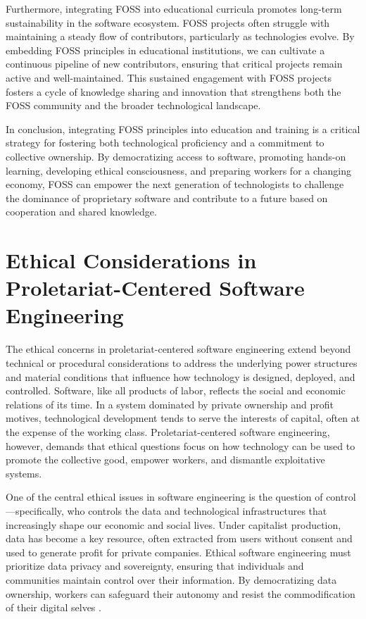 \begin{refsection}
Furthermore, integrating FOSS into educational curricula promotes long-term sustainability in the software ecosystem. FOSS projects often struggle with maintaining a steady flow of contributors, particularly as technologies evolve. By embedding FOSS principles in educational institutions, we can cultivate a continuous pipeline of new contributors, ensuring that critical projects remain active and well-maintained. This sustained engagement with FOSS projects fosters a cycle of knowledge sharing and innovation that strengthens both the FOSS community and the broader technological landscape.

In conclusion, integrating FOSS principles into education and training is a critical strategy for fostering both technological proficiency and a commitment to collective ownership. By democratizing access to software, promoting hands-on learning, developing ethical consciousness, and preparing workers for a changing economy, FOSS can empower the next generation of technologists to challenge the dominance of proprietary software and contribute to a future based on cooperation and shared knowledge.

\section{Ethical Considerations in Proletariat-Centered Software Engineering}

The ethical concerns in proletariat-centered software engineering extend beyond technical or procedural considerations to address the underlying power structures and material conditions that influence how technology is designed, deployed, and controlled. Software, like all products of labor, reflects the social and economic relations of its time. In a system dominated by private ownership and profit motives, technological development tends to serve the interests of capital, often at the expense of the working class. Proletariat-centered software engineering, however, demands that ethical questions focus on how technology can be used to promote the collective good, empower workers, and dismantle exploitative systems.

One of the central ethical issues in software engineering is the question of control—specifically, who controls the data and technological infrastructures that increasingly shape our economic and social lives. Under capitalist production, data has become a key resource, often extracted from users without consent and used to generate profit for private companies. Ethical software engineering must prioritize data privacy and sovereignty, ensuring that individuals and communities maintain control over their information. By democratizing data ownership, workers can safeguard their autonomy and resist the commodification of their digital selves \cite[pp.~120-122]{fuchs2014}. 


\end{refsection}
